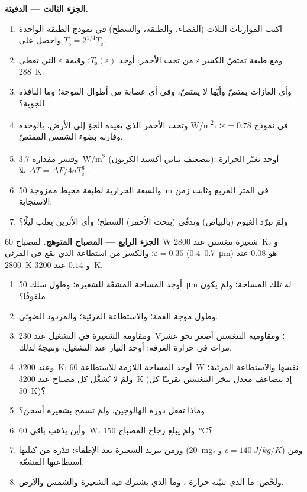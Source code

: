 \begin{problem}
\textbf{الجزء الثالث --- الدفيئة.}
\begin{enumerate}[resume]
  \item اكتب الموازنات الثلاث (الفضاء، والطبقة، والسطح) في
        نموذج الطبقة الواحدة واحصل على $T_{\text{s}} = 2^{1/4}T_{\text{e}}$.
  \item ومع طبقة تمتصّ الكسر $\varepsilon$ من
        تحت الأحمر: أوجد $T_{\text{s}}(\varepsilon)$؛ وقيمة $\varepsilon$
        التي تعطي \qty{288}{K}.
  \item وأي الغازات يمتصّ وأيّها لا يمتصّ، وفي أي عصابة
        من أطوال الموجة؛ وما النافذة الجوية؟
  \item وتحت الأحمر الذي يعيده الجوّ إلى الأرض،
        بالوحدة \unit{W/m^2}، في نموذج $\varepsilon = 0.78$؛ وقارنه
        بضوء الشمس الممتصّ.
  \item وقسر مقداره \qty{3.7}{W/m^2} (بتضعيف ثنائي أكسيد الكربون):
        أوجد تغيّر الحرارة $\Delta T = \Delta F/4\sigma T_{\text{e}}^3$
        بلا .
  \item والسعة الحرارية لطبقة محيط ممزوجة \qty{50}{m} في المتر
        المربع وثابت زمن الاستجابة.
  \item ولمَ تبرّد الغيوم (بالبياض) وتدفّئ (بتحت الأحمر)
        السطح؛ وأي الأثرين يغلب ليلًا؟
\end{enumerate}

\textbf{الجزء الرابع --- المصباح المتوهج.}
لمصباح \qty{60}{W} شعيرة تنغستن عند \qty{2800}{K}،
و $\varepsilon = 0.35$؛ والكسر من استطاعة  الذي يقع في
المرئي ($0.4$--\qty{0.7}{\micro m}) هو $0.08$ عند \qty{2800}{K} و $0.14$
عند \qty{3200}{K}.
\begin{enumerate}[resume]
  \item أوجد المساحة المشعّة للشعيرة؛ وطول سلك \qty{50}{\micro m}
        له تلك المساحة؛ ولمَ يكون ملفوفًا؟
  \item وطول موجة القمة؛ والاستطاعة المرئية؛ والمردود الضوئي.
  \item ومقاومة الشعيرة في التشغيل عند \qty{230}{V}؛ ومقاومية
        التنغستن أصغر نحو عشر مرات في حرارة الغرفة: أوجد التيار عند التشغيل، ونتيجةً لذلك.
  \item وعند \qty{3200}{K}: أوجد المساحة اللازمة للاستطاعة \qty{60}{W} نفسها
        والاستطاعة المرئية؛ ولمَ لا يُشغَّل كل مصباح عند \qty{3200}{K}
        (إذ يتضاعف معدل تبخر التنغستن تقريبًا كل
        \qty{50}{K})؟
  \item وماذا تفعل دورة الهالوجين، ولمَ تسمح بشعيرة
        أسخن؟
  \item وأين يذهب باقي \qty{60}{W}، ولمَ يبلغ زجاج
        المصباح \qty{150}{\celsius}؟
  \item وزمن تبريد الشعيرة بعد الإطفاء: قدّره من
        كتلتها (\qty{20}{mg}، و $c = \qty{140}{J/kg/K}$) ومن استطاعتها
        المشعّة.
  \item ولخّص: ما الذي تثبّته حرارة ، وما الذي
        يشترك فيه الشعيرة والشمس والأرض.
\end{enumerate}
\end{problem}
